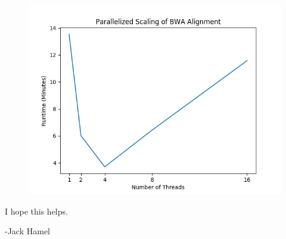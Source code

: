 \documentclass[letterpaper,11pt]{article}
\begin{document}
\begin{figure}[H]
  \includegraphics[scale=0.9]{plot_timings.png}
\end{figure}

I hope this helps.\newline

-Jack Hamel
\end{document}
